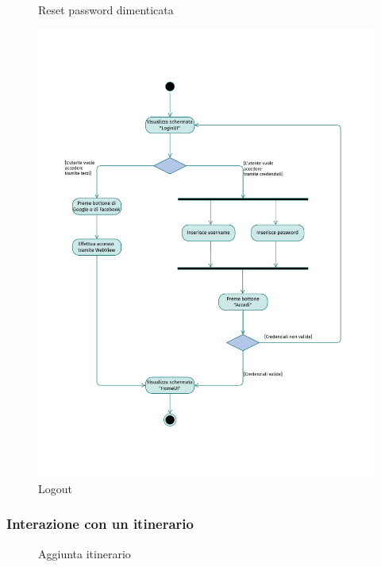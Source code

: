 \documentclass{natourDoc}
\begin{document}
\newpage
\begin{figure}[!htbp]
	\centering
	
	\caption{Reset password dimenticata}
\end{figure}
\FloatBarrier

\newpage
\begin{figure}[!htbp]
	\centering
	\includegraphics[width=\textwidth, page=16]{./diagrams/activity.pdf}
	\caption{Logout}
\end{figure}
\FloatBarrier


\newpage
\subsubsection{Interazione con un itinerario}
\begin{figure}[!htbp]
	\centering
	
	\caption{Aggiunta itinerario}
\end{figure}
\FloatBarrier
\end{document}
